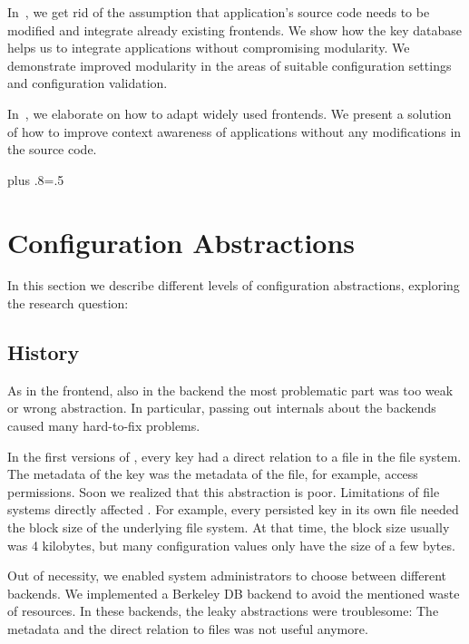 In~, we get rid of the assumption that application's source code needs to be modified and integrate already existing frontends.
We show how the key database helps us to integrate applications without compromising modularity.
We demonstrate improved modularity in the areas of suitable configuration settings and configuration validation.

In~, we elaborate on how to adapt widely used frontends.
We present a solution of how to improve context awareness of applications without any modifications in the source code.%
{\parfillskip=0pt plus .8\textwidth \emergencystretch=.5\textwidth \par}





\section{Configuration Abstractions}
\label{sec:configuration-abstractions}

In this section we describe different levels of configuration abstractions, exploring the research question:
\rqBackendDesignDecisions*

\subsection{History}

As in the frontend, also in the backend the most problematic part was too weak or wrong abstraction.
In particular, passing out internals about the backends caused many hard-to-fix problems.

In the first versions of \elektra{}, every key had a direct relation to a file in the file system.
The metadata of the key was the metadata of the file, for example, access permissions.
Soon we realized that this abstraction is poor.
Limitations of file systems directly affected \elektra{}.
For example, every persisted key in its own file needed the block size of the underlying file system.
At that time, the block size usually was 4 kilobytes, but many configuration values only have the size of a few bytes.

Out of necessity, we enabled system administrators to choose between different backends.
We implemented a Berkeley DB backend to avoid the mentioned waste of resources.
In these backends, the leaky abstractions were troublesome:
The metadata and the direct relation to files was not useful anymore.

